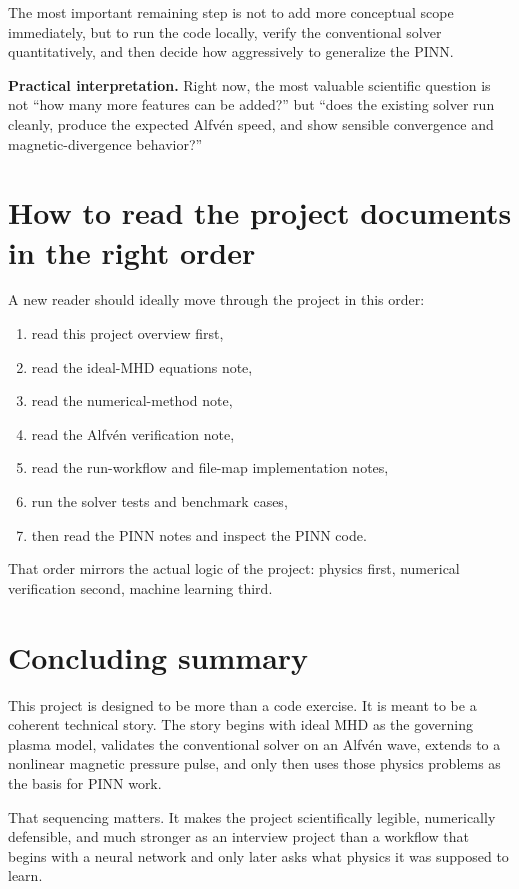 \documentclass[11pt]{article}
\begin{document}
The most important remaining step is not to add more conceptual scope immediately, but to run the code locally, verify the conventional solver quantitatively, and then decide how aggressively to generalize the PINN.

\begin{physicsbox}
\textbf{Practical interpretation.} Right now, the most valuable scientific question is not ``how many more features can be added?'' but ``does the existing solver run cleanly, produce the expected Alfv\'en speed, and show sensible convergence and magnetic-divergence behavior?''
\end{physicsbox}

\section{How to read the project documents in the right order}

A new reader should ideally move through the project in this order:
\begin{enumerate}[leftmargin=1.8em]
    \item read this project overview first,
    \item read the ideal-MHD equations note,
    \item read the numerical-method note,
    \item read the Alfv\'en verification note,
    \item read the run-workflow and file-map implementation notes,
    \item run the solver tests and benchmark cases,
    \item then read the PINN notes and inspect the PINN code.
\end{enumerate}

That order mirrors the actual logic of the project: physics first, numerical verification second, machine learning third.

\section{Concluding summary}

This project is designed to be more than a code exercise. It is meant to be a coherent technical story. The story begins with ideal MHD as the governing plasma model, validates the conventional solver on an Alfv\'en wave, extends to a nonlinear magnetic pressure pulse, and only then uses those physics problems as the basis for PINN work.

That sequencing matters. It makes the project scientifically legible, numerically defensible, and much stronger as an interview project than a workflow that begins with a neural network and only later asks what physics it was supposed to learn.
\end{document}
